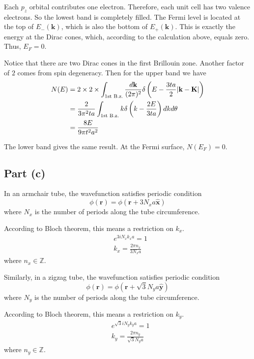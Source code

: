\documentclass{article}
\begin{document}
Each $p_z$ orbital contributes one electron. Therefore, each unit cell has two valence electrons. So the lowest band is completely filled. The Fermi level is located at the top of $E_-(\mathbf{k})$, which is also the bottom of $E_+(\mathbf{k})$. This is exactly the energy at the Dirac cones, which, according to the calculation above, equals zero. Thus, $E_F=0$.


Notice that there are two Dirac cones in the first Brillouin zone. Another factor of $2$ comes from spin degeneracy. Then for the upper band we have
\begin{align*}
	N(E)&=2\times 2\times\int_{\textup{1st B.z.}}\frac{d\mathbf{k}}{(2\pi)^2}\delta\left(E-\frac{3ta}{2}|\mathbf{k}-\mathbf{K}|\right)\\
	&=\frac{2}{3\pi^2ta}\int_{\textup{1st B.z.}}k\delta\left(k-\frac{2E}{3ta}\right)dkd\theta\\
	&=\frac{8E}{9\pi t^2a^2}
\end{align*}

The lower band gives the same result. At the Fermi surface, $N(E_F)=0$.

\subsection{Part (c)}
In an armchair tube, the wavefunction satisfies periodic condition
\begin{equation*}
	\phi(\mathbf{r})=\phi(\mathbf{r}+3N_xa\hat{\mathbf{x}})
\end{equation*}
where $N_x$ is the number of periods along the tube circumference.

According to Bloch theorem, this means a restriction on $k_x$.
\begin{align*}
	&e^{3iN_xk_xa}=1\\
	&k_x=\frac{2\pi n_x}{3N_xa}
\end{align*}
where $n_x\in\mathbb{Z}$.

Similarly, in a zigzag tube, the wavefunction satisfies periodic condition
\begin{equation*}
	\phi(\mathbf{r})=\phi(\mathbf{r}+\sqrt{3}N_ya\hat{\mathbf{y}})
\end{equation*}
where $N_y$ is the number of periods along the tube circumference.

According to Bloch theorem, this means a restriction on $k_y$.
\begin{align*}
	&e^{\sqrt{3}iN_yk_ya}=1\\
	&k_y=\frac{2\pi n_y}{\sqrt{3}N_ya}
\end{align*}
where $n_y\in\mathbb{Z}$.
\end{document}
